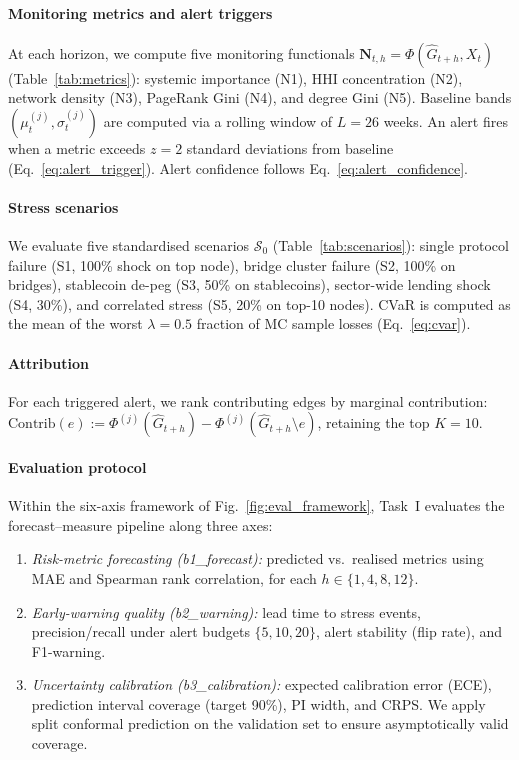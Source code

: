 \paragraph{Monitoring metrics and alert triggers}
At each horizon, we compute five monitoring functionals $\mathbf{N}_{t,h}=\Phi(\widehat{G}_{t+h},X_t)$ (Table~\ref{tab:metrics}): systemic importance (N1), HHI concentration (N2), network density (N3), PageRank Gini (N4), and degree Gini (N5). Baseline bands $(\mu_t^{(j)}, \sigma_t^{(j)})$ are computed via a rolling window of $L=26$ weeks. An alert fires when a metric exceeds $z=2$ standard deviations from baseline (Eq.~\eqref{eq:alert_trigger}). Alert confidence follows Eq.~\eqref{eq:alert_confidence}.

\paragraph{Stress scenarios}
We evaluate five standardised scenarios $\mathcal{S}_0$ (Table~\ref{tab:scenarios}): single protocol failure (S1, 100\% shock on top node), bridge cluster failure (S2, 100\% on bridges), stablecoin de-peg (S3, 50\% on stablecoins), sector-wide lending shock (S4, 30\%), and correlated stress (S5, 20\% on top-10 nodes). CVaR is computed as the mean of the worst $\lambda=0.5$ fraction of MC sample losses (Eq.~\eqref{eq:cvar}).

\paragraph{Attribution}
For each triggered alert, we rank contributing edges by marginal contribution: $\mathrm{Contrib}(e) := \Phi^{(j)}(\widehat{G}_{t+h}) - \Phi^{(j)}(\widehat{G}_{t+h}\setminus e)$, retaining the top $K=10$.

\paragraph{Evaluation protocol}
Within the six-axis framework of Fig.~\ref{fig:eval_framework}, Task~I evaluates the forecast--measure pipeline along three axes:
\begin{enumerate}[leftmargin=*,itemsep=1pt]
    \item \emph{Risk-metric forecasting (b1_forecast):} predicted vs.\ realised metrics using MAE and Spearman rank correlation, for each $h\in\{1,4,8,12\}$.
    \item \emph{Early-warning quality (b2_warning):} lead time to stress events, precision/recall under alert budgets $\{5,10,20\}$, alert stability (flip rate), and F1-warning.
    \item \emph{Uncertainty calibration (b3_calibration):} expected calibration error (ECE), prediction interval coverage (target 90\%), PI width, and CRPS. We apply split conformal prediction on the validation set to ensure asymptotically valid coverage.
\end{enumerate}

